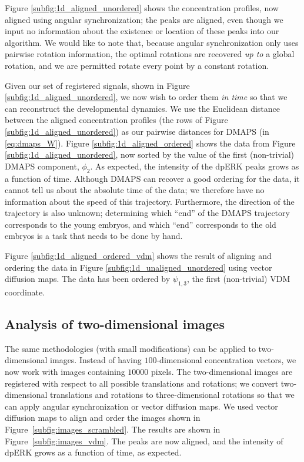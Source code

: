 \documentclass{pnastwo}
\begin{document}
\begin{article}
Figure \ref{subfig:1d_aligned_unordered} shows the concentration profiles, now aligned using angular synchronization;
the peaks are aligned, even though we input no information about the existence or location of these peaks into our algorithm.
%
We would like to note that, because angular synchronization only uses pairwise rotation information, the optimal rotations are recovered {\em up to} a global rotation, and we are permitted rotate every point by a constant rotation.

Given our set of registered signals, shown in Figure \ref{subfig:1d_aligned_unordered}, we now wish to order them {\em in time} so that we can reconstruct the developmental dynamics.
%
We use the Euclidean distance between the aligned concentration profiles (the rows of Figure \ref{subfig:1d_aligned_unordered}) as our pairwise distances for DMAPS (in \eqref{eq:dmaps_W}).
%
Figure \ref{subfig:1d_aligned_ordered} shows the data from Figure \ref{subfig:1d_aligned_unordered}, now sorted by the value of the first (non-trivial) DMAPS component, $\phi_2$. 
%
As expected, the intensity of the dpERK peaks grows as a function of time. 
%
Although DMAPS can recover a good ordering for the data, it cannot tell us about the absolute time of the data; we therefore have no information about the speed of this trajectory.
%
Furthermore, the direction of the trajectory is also unknown; determining which ``end'' of the DMAPS trajectory corresponds to the young embryos, and which ``end'' corresponds to the old embryos is a task that needs to be done by hand.

Figure \ref{subfig:1d_aligned_ordered_vdm} shows the result of aligning and ordering the data in Figure \ref{subfig:1d_unaligned_unordered} using vector diffusion maps. 
%
The data has been ordered by $\psi_{1, 3}$, the first (non-trivial) VDM coordinate. 

\subsection{Analysis of two-dimensional images}

The same methodologies (with small modifications) can be applied to two-dimensional images.
%
Instead of having $100$-dimensional concentration vectors, we now work with images containing $10000$ pixels.
%
The two-dimensional images are registered with respect to all possible translations and rotations; 
we convert two-dimensional translations and rotations to three-dimensional rotations so that we can apply angular synchronization or vector diffusion maps. 
%
We used vector diffusion maps to align and order the images shown in Figure~\ref{subfig:images_scrambled}.
%
The results are shown in Figure~\ref{subfig:images_vdm}.
%
The peaks are now aligned, and the intensity of dpERK grows as a function of time, as expected.


\end{article}
\end{document}
